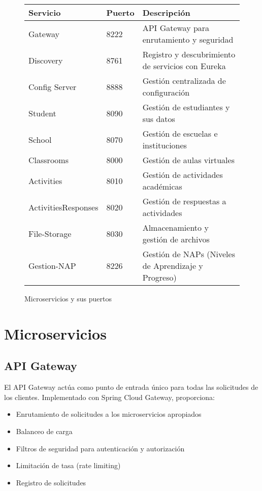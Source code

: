 \documentclass[12pt,a4paper]{report}
\begin{document}
\begin{figure}[H]
    \centering
    \begin{tabular}{|l|l|p{8cm}|}
        \hline
        \textbf{Servicio} & \textbf{Puerto} & \textbf{Descripción} \\
        \hline
        Gateway & 8222 & API Gateway para enrutamiento y seguridad \\
        \hline
        Discovery & 8761 & Registro y descubrimiento de servicios con Eureka \\
        \hline
        Config Server & 8888 & Gestión centralizada de configuración \\
        \hline
        Student & 8090 & Gestión de estudiantes y sus datos \\
        \hline
        School & 8070 & Gestión de escuelas e instituciones \\
        \hline
        Classrooms & 8000 & Gestión de aulas virtuales \\
        \hline
        Activities & 8010 & Gestión de actividades académicas \\
        \hline
        ActivitiesResponses & 8020 & Gestión de respuestas a actividades \\
        \hline
        File-Storage & 8030 & Almacenamiento y gestión de archivos \\
        \hline
        Gestion-NAP & 8226 & Gestión de NAPs (Niveles de Aprendizaje y Progreso) \\
        \hline
    \end{tabular}
    \caption{Microservicios y sus puertos}
    \label{tab:services}
\end{figure}

\section{Microservicios}
\subsection{API Gateway}
El API Gateway actúa como punto de entrada único para todas las solicitudes de los clientes. Implementado con Spring Cloud Gateway, proporciona:

\begin{itemize}
    \item Enrutamiento de solicitudes a los microservicios apropiados
    \item Balanceo de carga
    \item Filtros de seguridad para autenticación y autorización
    \item Limitación de tasa (rate limiting)
    \item Registro de solicitudes
\end{itemize}
\end{document}
